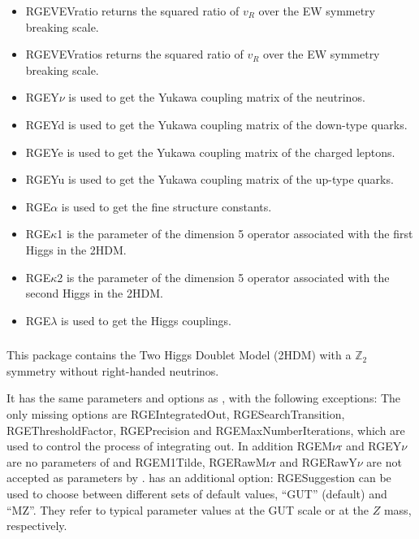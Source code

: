 \documentclass[10pt,a4paper,twoside]{scrartcl}
\begin{document}
\begin{itemize}
\item 
RGEVEVratio returns the squared ratio of $v_R$ over the EW symmetry breaking scale.
\item 
RGEVEVratios returns the squared ratio of $v_R$ over the EW symmetry breaking scale.
\item 
RGEY$\nu$ is used to get the Yukawa coupling matrix of the neutrinos.
\item 
RGEYd is used to get the Yukawa coupling matrix of the down-type quarks.
\item 
 RGEYe is used to get the Yukawa coupling matrix of the charged leptons.
\item 
RGEYu is used to get the Yukawa coupling matrix of the up-type quarks.
\item 
RGE$\alpha$ is used to get the fine structure constants.
\item 
RGE$\kappa$1 is the parameter of the dimension 5 operator associated
  with the first Higgs in the 2HDM.
\item 
RGE$\kappa$2 is the parameter of the dimension 5 operator associated
  with the second Higgs in the 2HDM.
  
\item 
RGE$\lambda$ is used to get the Higgs couplings.

\end{itemize}

  

\subsubsection[\package{RGE2HDM0N}]{}
This package contains the Two Higgs Doublet Model (2HDM) with a $\mathbb{Z}_2$
symmetry without right-handed neutrinos.

\vspace{2ex} It has the same parameters and options as
, with the following exceptions:  The
only missing options are RGEIntegratedOut, RGESearchTransition,
RGEThresholdFactor, RGEPrecision and RGEMaxNumberIterations, which are used to
control the process of integrating out.  In addition RGEM$\nu$r and RGEY$\nu$
are no parameters of  and RGEM1Tilde, RGERawM$\nu$r and RGERawY$\nu$
are not accepted as parameters by .
 has an additional option: RGESuggestion can be
used to choose between different sets of default values, ``GUT''
(default) and ``MZ''.  They refer to typical parameter values at the GUT
scale or at the $Z$ mass, respectively.
\end{document}
